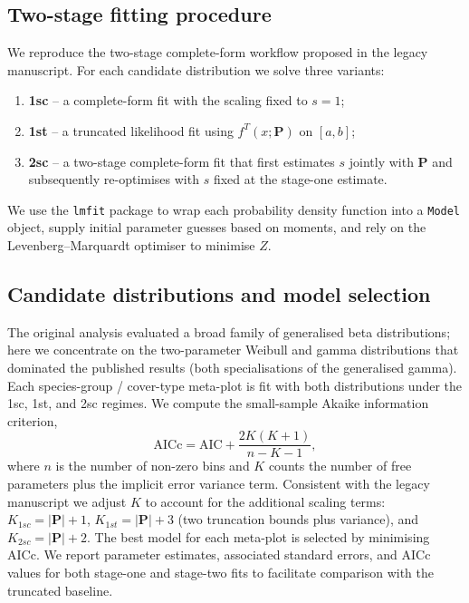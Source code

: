\subsection{Two-stage fitting procedure}
\label{sec:methods_twostage}

We reproduce the two-stage complete-form workflow proposed in the legacy manuscript. For each candidate distribution we solve three variants:
\begin{enumerate}
  \item \textbf{1sc} -- a complete-form fit with the scaling fixed to $s = 1$;
  \item \textbf{1st} -- a truncated likelihood fit using $f^{T}(x; \bm{P})$ on $[a, b]$;
  \item \textbf{2sc} -- a two-stage complete-form fit that first estimates $s$ jointly with $\bm{P}$ and subsequently re-optimises with $s$ fixed at the stage-one estimate.
\end{enumerate}
We use the \texttt{lmfit} package to wrap each probability density function into a \texttt{Model} object, supply initial parameter guesses based on moments, and rely on the Levenberg--Marquardt optimiser to minimise $Z$.

\subsection{Candidate distributions and model selection}
\label{sec:methods_candidates}

The original analysis evaluated a broad family of generalised beta distributions; here we concentrate on the two-parameter Weibull and gamma distributions that dominated the published results (both specialisations of the generalised gamma). Each species-group / cover-type meta-plot is fit with both distributions under the 1sc, 1st, and 2sc regimes. We compute the small-sample Akaike information criterion,
\begin{equation}
  \text{AICc} = \text{AIC} + \frac{2K(K+1)}{n - K - 1},
\end{equation}
where $n$ is the number of non-zero bins and $K$ counts the number of free parameters plus the implicit error variance term. Consistent with the legacy manuscript we adjust $K$ to account for the additional scaling terms: $K_{1sc} = |\bm{P}| + 1$, $K_{1st} = |\bm{P}| + 3$ (two truncation bounds plus variance), and $K_{2sc} = |\bm{P}| + 2$. The best model for each meta-plot is selected by minimising AICc. We report parameter estimates, associated standard errors, and AICc values for both stage-one and stage-two fits to facilitate comparison with the truncated baseline.
